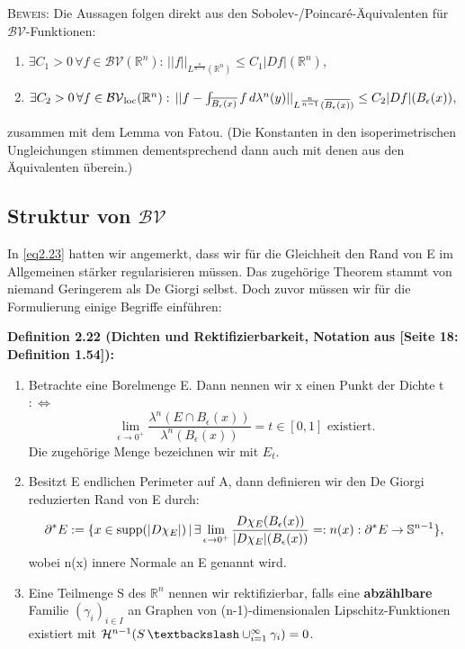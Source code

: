 \textsc{Beweis:} Die Aussagen folgen direkt aus den Sobolev-/Poincaré-Äquivalenten für \(\mathcal{BV}\)-Funktionen:
\begin{enumerate}
    \item \(\exists C_1 > 0 \, \forall f \in \mathcal{BV}(\mathbb{R}^n): \, ||f||_{L^{\frac{n}{n-1}}(\mathbb{R}^n)} \leq C_1 |Df|(\mathbb{R}^n)\),
    \item \(\exists C_2 > 0 \, \forall f \in \mathcal{BV}_{\text{loc}}(\mathbb{R}^n): \, ||f - \int_{\overline{B_{\epsilon}(x)}}f \, d\lambda^n(y)||_{L^{\frac{n}{n-1}}(\overline{B_{\epsilon}(x)})} \leq C_2 |Df|(B_{\epsilon}(x))\),
\end{enumerate}
zusammen mit dem Lemma von Fatou. (Die Konstanten in den isoperimetrischen Ungleichungen stimmen dementsprechend dann auch mit denen aus den Äquivalenten überein.)\QEDB

\subsection[Struktur von BV]{Struktur von \(\mathcal{BV}\)}{\label{subsec:bvstruc}}
In \eqref{eq2.23} hatten wir angemerkt, dass wir für die Gleichheit den Rand von E im Allgemeinen stärker regularisieren müssen. Das zugehörige Theorem stammt von niemand Geringerem als De Giorgi selbst. Doch zuvor müssen wir für die Formulierung einige Begriffe einführen:\\[0.5cm]
\colorbox{generalYellow}{\begin{minipage}{16cm}{\textcolor{black}{}{\label{def2.22}}}
\textbf{Definition 2.22 (Dichten und Rektifizierbarkeit, Notation aus \cite{BraidesApprox}[Seite 18: Definition 1.54]):} \begin{enumerate}
\item Betrachte eine Borelmenge E. Dann nennen wir x einen Punkt der Dichte t \(:\Leftrightarrow\)
    \begin{equation}
        \lim_{\epsilon \to 0^+} \frac{\lambda^n(E \cap B_{\epsilon}(x))}{\lambda^n(B_{\epsilon}(x))} = t \in [0,1]\text{ existiert.}
    \end{equation}
    Die zugehörige Menge bezeichnen wir mit \(E_t\). 
\item Besitzt E endlichen Perimeter auf A, dann definieren wir den De Giorgi reduzierten Rand von E durch:
\begin{equation}{\label{eq2.28}}
    \partial^* E := \{x \in \text{supp} (|D \chi_E |) \, | \, \exists \lim_{\epsilon \to 0^+} \frac{D \chi_E (B_{\epsilon}(x))}{|D \chi_E|(B_{\epsilon}(x))} =: n(x) : \partial^* E \to \mathbb{S}^{n-1}\},
\end{equation}
wobei n(x) innere Normale an E genannt wird.
\item Eine Teilmenge S des \(\mathbb{R}^n\) nennen wir rektifizierbar, falls eine  \textbf{abzählbare} Familie \((\gamma_i)_{i \in I}\) an Graphen von (n-1)-dimensionalen Lipschitz-Funktionen existiert mit \(\mathcal{H}^{n-1}(S \, \textbackslash \cup_{i=1}^{\infty} \gamma_i) = 0\).
\end{enumerate}
\end{minipage}}\\

